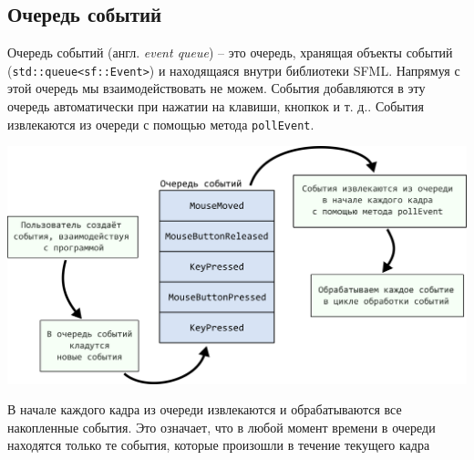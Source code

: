 \documentclass{article}
\begin{document}
\subsection*{Очередь событий}
Очередь событий (англ. \textit{event queue}) -- это очередь, хранящая объекты событий (\texttt{std::queue<sf::Event>}) и находящаяся внутри библиотеки SFML. Напрямуя с этой очередь мы взаимодействовать не можем. События добавляются в эту очередь автоматически при нажатии на клавиши, кнопкок и т. д.. События извлекаются из очереди с помощью метода \texttt{pollEvent}.
\begin{center}
\includegraphics[scale=0.9]{../images/event_queue.png}
\end{center}
В начале каждого кадра из очереди извлекаются и обрабатываются все накопленные события. Это означает, что в любой момент времени в очереди находятся только те события, которые произошли в течение текущего кадра



\newpage
\end{document}
